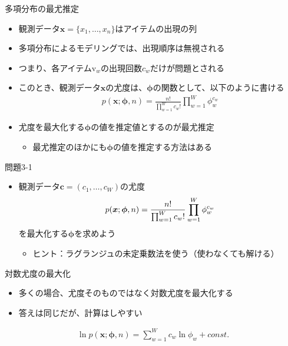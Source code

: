 \documentclass[aspectratio=169,unicode,dvipdfmx,14pt]{beamer}
\begin{document}
\begin{frame}{多項分布の最尤推定}
\begin{itemize}
\item 観測データ$\bm{x}=\{x_1,\ldots,x_n\}$はアイテムの出現の列
\item 多項分布によるモデリングでは、出現順序は無視される
\item つまり、各アイテム$\mbox{v}_w$の出現回数$c_w$だけが問題とされる
\item このとき、観測データ$\bm{x}$の尤度は、$\bm{\phi}$の関数として、以下のように書ける
\begin{align}
p(\bm{x};\bm{\phi},n)=\frac{n!}{\prod_{w=1}^W c_w!}\prod_{w=1}^W\phi_w^{c_w}
\end{align}
\item 尤度を最大化する$\bm{\phi}$の値を推定値とするのが最尤推定
\begin{itemize}
\item 最尤推定のほかにも$\bm{\phi}$の値を推定する方法はある
\end{itemize}
\end{itemize}
\end{frame}

\begin{frame}{問題3-1}
\begin{itemize} 
\item 観測データ$\bm{c}=(c_1,\ldots,c_W)$の尤度
\begin{align}
p(\bm{x};\bm{\phi},n)=\frac{n!}{\prod_{w=1}^W c_w!}\prod_{w=1}^W\phi_w^{c_w} \notag
\end{align}
を最大化する$\bm{\phi}$を求めよう
\begin{itemize}
\item ヒント：ラグランジュの未定乗数法を使う（使わなくても解ける） 
\end{itemize}
\end{itemize}
\end{frame}

\begin{frame}{対数尤度の最大化}
\begin{itemize}
\item 多くの場合、尤度そのものではなく対数尤度を最大化する
\item 答えは同じだが、計算はしやすい
\end{itemize}
\begin{align}
\ln p(\bm{x};\bm{\phi},n)=\sum_{w=1}^W c_w\ln\phi_w + const.
\end{align}
\end{frame}
\end{document}

